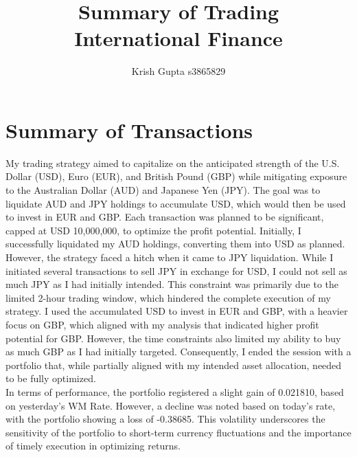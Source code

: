\documentclass{article}
\title{Summary of Trading\\
        International Finance}
\author{Krish Gupta s3865829}
\begin{document}
\maketitle

\tableofcontents
\pagebreak

\section*{Summary of Transactions}
My trading strategy aimed to capitalize on the anticipated strength of the U.S. Dollar (USD), Euro (EUR), and British Pound (GBP) while mitigating exposure to the Australian Dollar (AUD) and Japanese Yen (JPY). The goal was to liquidate AUD and JPY holdings to accumulate USD, which would then be used to invest in EUR and GBP. Each transaction was planned to be significant, capped at USD 10,000,000, to optimize the profit potential.
Initially, I successfully liquidated my AUD holdings, converting them into USD as planned. However, the strategy faced a hitch when it came to JPY liquidation. While I initiated several transactions to sell JPY in exchange for USD, I could not sell as much JPY as I had initially intended. This constraint was primarily due to the limited 2-hour trading window, which hindered the complete execution of my strategy.
I used the accumulated USD to invest in EUR and GBP, with a heavier focus on GBP, which aligned with my analysis that indicated higher profit potential for GBP. However, the time constraints also limited my ability to buy as much GBP as I had initially targeted. Consequently, I ended the session with a portfolio that, while partially aligned with my intended asset allocation, needed to be fully optimized.\\

\noindent In terms of performance, the portfolio registered a slight gain of 0.021810, based on yesterday's WM Rate. However, a decline was noted based on today's rate, with the portfolio showing a loss of -0.38685. This volatility underscores the sensitivity of the portfolio to short-term currency fluctuations and the importance of timely execution in optimizing returns.
\end{document}
